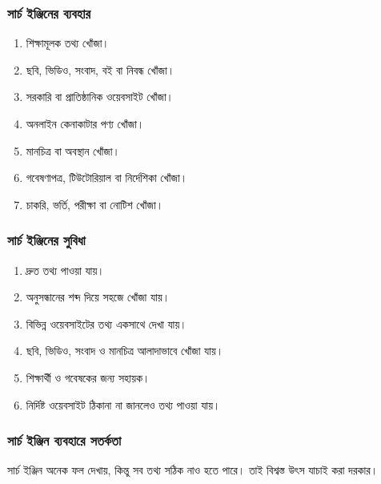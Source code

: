 \par\noindent
\begin{minipage}[t]{.48\linewidth}\vspace{0pt}
\subsubsection{সার্চ ইঞ্জিনের ব্যবহার}

\begin{enumerate}
\item শিক্ষামূলক তথ্য খোঁজা।
\item ছবি, ভিডিও, সংবাদ, বই বা নিবন্ধ খোঁজা।
\item সরকারি বা প্রাতিষ্ঠানিক ওয়েবসাইট খোঁজা।
\item অনলাইন কেনাকাটার পণ্য খোঁজা।
\item মানচিত্র বা অবস্থান খোঁজা।
\item গবেষণাপত্র, টিউটোরিয়াল বা নির্দেশিকা খোঁজা।
\item চাকরি, ভর্তি, পরীক্ষা বা নোটিশ খোঁজা।
\end{enumerate}
\end{minipage}\hfill
\begin{minipage}[t]{.48\linewidth}\vspace{0pt}
\subsubsection{সার্চ ইঞ্জিনের সুবিধা}

\begin{enumerate}
\item দ্রুত তথ্য পাওয়া যায়।
\item অনুসন্ধানের শব্দ দিয়ে সহজে খোঁজা যায়।
\item বিভিন্ন ওয়েবসাইটের তথ্য একসাথে দেখা যায়।
\item ছবি, ভিডিও, সংবাদ ও মানচিত্র আলাদাভাবে খোঁজা যায়।
\item শিক্ষার্থী ও গবেষকের জন্য সহায়ক।
\item নির্দিষ্ট ওয়েবসাইট ঠিকানা না জানলেও তথ্য পাওয়া যায়।
\end{enumerate}
\end{minipage}\par\smallskip
\subsubsection{সার্চ ইঞ্জিন ব্যবহারে সতর্কতা}

সার্চ ইঞ্জিন অনেক ফল দেখায়, কিন্তু সব তথ্য সঠিক নাও হতে পারে। তাই বিশ্বস্ত উৎস যাচাই করা দরকার।

